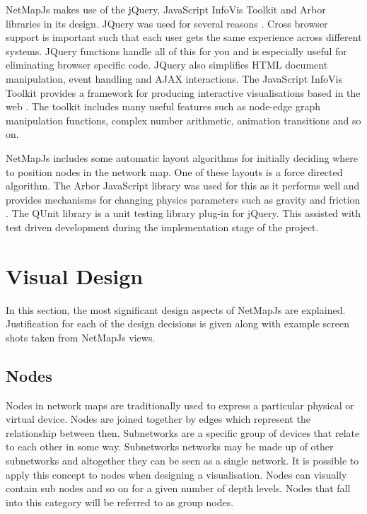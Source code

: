 \documentclass[11pt, a4paper]{article}
\begin{document}
NetMapJs makes use of the jQuery, JavaScript InfoVis Toolkit and Arbor libraries
in its design. JQuery was used for several reasons \cite{jQuery_website}. Cross
browser support is important such that each user gets the same experience across
different systems. JQuery functions handle all of this for you and is especially
useful for eliminating browser specific code. JQuery also simplifies HTML
document manipulation, event handling and AJAX interactions. The JavaScript
InfoVis Toolkit provides a framework for producing interactive visualisations
based in the web \cite{thejit_website}. The toolkit includes many useful
features such as node-edge graph manipulation functions, complex number
arithmetic, animation transitions and so on.

NetMapJs includes some automatic layout algorithms for initially deciding
where to position nodes in the network map. One of these layouts is a force
directed algorithm.  The Arbor JavaScript library was used for this as it
performs well and provides mechanisms for changing physics parameters such as
gravity and friction \cite{Arbor_website}. The QUnit library is a unit testing
library plug-in for jQuery. This assisted with test driven development during
the implementation stage of the project.

\pagebreak

\section{Visual Design} 
\label{sec:visual-design}

In this section, the most significant design aspects of NetMapJs are explained.
Justification for each of the design decisions is given along with example
screen shots taken from NetMapJs views.

\subsection{Nodes}
\label{sec:nodes.vis}


Nodes in network maps are traditionally used to express a particular physical or
virtual device. Nodes are joined together by edges which represent the
relationship between then. Subnetworks are a specific group of devices that
relate to each other in some way. Subnetworks networks may be made up of other
subnetworks and altogether they can be seen as a single network. It is possible
to apply this concept to nodes when designing a visualisation. Nodes can
visually contain sub nodes and so on for a given number of depth levels. Nodes
that fall into this category will be referred to as group nodes.
\end{document}
